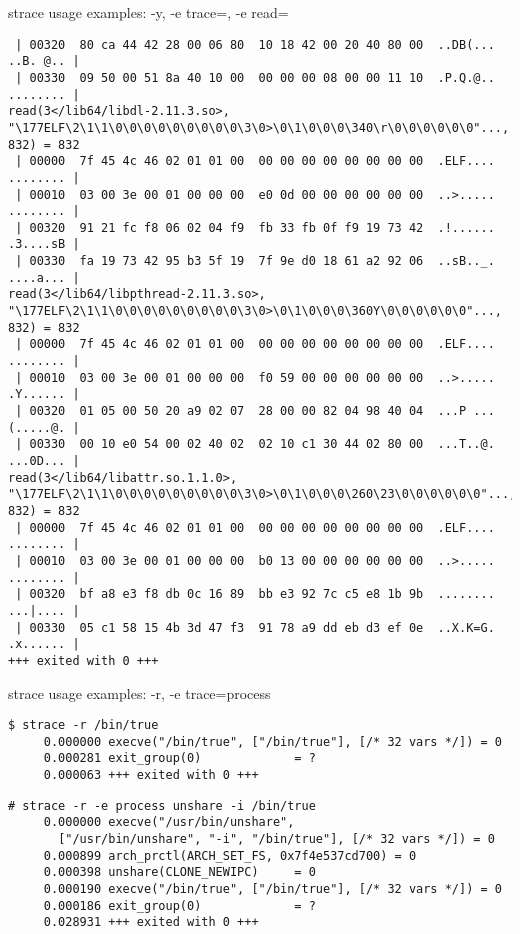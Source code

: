 \documentclass[unicode]{beamer}
\begin{document}
\begin{frame}[fragile]{strace usage examples: -y, -e trace=, -e read=}
\begin{verbatim}
 | 00320  80 ca 44 42 28 00 06 80  10 18 42 00 20 40 80 00  ..DB(... ..B. @.. |
 | 00330  09 50 00 51 8a 40 10 00  00 00 00 08 00 00 11 10  .P.Q.@.. ........ |
read(3</lib64/libdl-2.11.3.so>, "\177ELF\2\1\1\0\0\0\0\0\0\0\0\0\3\0>\0\1\0\0\0\340\r\0\0\0\0\0\0"..., 832) = 832
 | 00000  7f 45 4c 46 02 01 01 00  00 00 00 00 00 00 00 00  .ELF.... ........ |
 | 00010  03 00 3e 00 01 00 00 00  e0 0d 00 00 00 00 00 00  ..>..... ........ |
 | 00320  91 21 fc f8 06 02 04 f9  fb 33 fb 0f f9 19 73 42  .!...... .3....sB |
 | 00330  fa 19 73 42 95 b3 5f 19  7f 9e d0 18 61 a2 92 06  ..sB.._. ....a... |
read(3</lib64/libpthread-2.11.3.so>, "\177ELF\2\1\1\0\0\0\0\0\0\0\0\0\3\0>\0\1\0\0\0\360Y\0\0\0\0\0\0"..., 832) = 832
 | 00000  7f 45 4c 46 02 01 01 00  00 00 00 00 00 00 00 00  .ELF.... ........ |
 | 00010  03 00 3e 00 01 00 00 00  f0 59 00 00 00 00 00 00  ..>..... .Y...... |
 | 00320  01 05 00 50 20 a9 02 07  28 00 00 82 04 98 40 04  ...P ... (.....@. |
 | 00330  00 10 e0 54 00 02 40 02  02 10 c1 30 44 02 80 00  ...T..@. ...0D... |
read(3</lib64/libattr.so.1.1.0>, "\177ELF\2\1\1\0\0\0\0\0\0\0\0\0\3\0>\0\1\0\0\0\260\23\0\0\0\0\0\0"..., 832) = 832
 | 00000  7f 45 4c 46 02 01 01 00  00 00 00 00 00 00 00 00  .ELF.... ........ |
 | 00010  03 00 3e 00 01 00 00 00  b0 13 00 00 00 00 00 00  ..>..... ........ |
 | 00320  bf a8 e3 f8 db 0c 16 89  bb e3 92 7c c5 e8 1b 9b  ........ ...|.... |
 | 00330  05 c1 58 15 4b 3d 47 f3  91 78 a9 dd eb d3 ef 0e  ..X.K=G. .x...... |
+++ exited with 0 +++
\end{verbatim}
\end{frame}

\begin{frame}[fragile]{strace usage examples: -r, -e trace=process}
\scriptsize
\begin{verbatim}
$ strace -r /bin/true
     0.000000 execve("/bin/true", ["/bin/true"], [/* 32 vars */]) = 0
     0.000281 exit_group(0)             = ?
     0.000063 +++ exited with 0 +++
\end{verbatim}

\begin{verbatim}
# strace -r -e process unshare -i /bin/true
     0.000000 execve("/usr/bin/unshare",
       ["/usr/bin/unshare", "-i", "/bin/true"], [/* 32 vars */]) = 0
     0.000899 arch_prctl(ARCH_SET_FS, 0x7f4e537cd700) = 0
     0.000398 unshare(CLONE_NEWIPC)     = 0
     0.000190 execve("/bin/true", ["/bin/true"], [/* 32 vars */]) = 0
     0.000186 exit_group(0)             = ?
     0.028931 +++ exited with 0 +++
\end{verbatim}
\end{frame}
\end{document}
